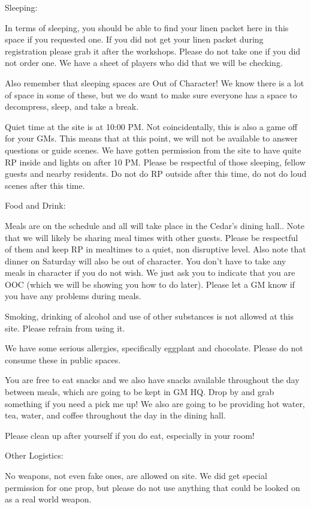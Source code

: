 \documentclass[green]{GL2020}
\begin{document}
Sleeping:

In terms of sleeping, you should be able to find your linen packet here in this space if you requested one.  If you did not get your linen packet during registration please grab it after the workshops.  Please do not take one if you did not order one.  We have a sheet of players who did that we will be checking.  

Also remember that sleeping spaces are Out of Character!  We know there is a lot of space in some of these, but we do want to make sure everyone has a space to decompress, sleep, and take a break.

Quiet time at the site is at 10:00 PM.  Not coincidentally, this is also a game off for your GMs.   This means that at this point, we will not be available to answer questions or guide scenes.  We have gotten permission from the site to have quite RP inside and lights on after 10 PM.  Please be respectful of those sleeping, fellow guests and nearby residents.  Do not do RP outside after this time, do not do loud scenes after this time.

Food and Drink:

Meals are on the schedule and all will take place in the Cedar’s dining hall..  Note that we will likely be sharing meal times with other guests.  Please be respectful of them and keep RP in mealtimes to a quiet, non disruptive level.  Also note that dinner on Saturday will also be out of character.  You don’t have to take any meals in character if you do not wish.  We just ask you to indicate that you are OOC (which we will be showing you how to do later).  Please let a GM know if you have any problems during meals.

Smoking, drinking of alcohol and use of other substances is not allowed at this site.  Please refrain from using it.

We have some serious allergies, specifically eggplant and chocolate.  Please do not consume these in public spaces.  

You are free to eat snacks and we also have snacks available throughout the day between meals, which are going to be kept in GM HQ. Drop by and grab something if you need a pick me up!  We also are going to be providing hot water, tea, water, and coffee throughout the day in the dining hall.

Please clean up after yourself if you do eat, especially in your room!

Other Logistics:

No weapons, not even fake ones, are allowed on site.  We did get special permission for one prop, but please do not use anything that could be looked on as a real world weapon.
\end{document}

